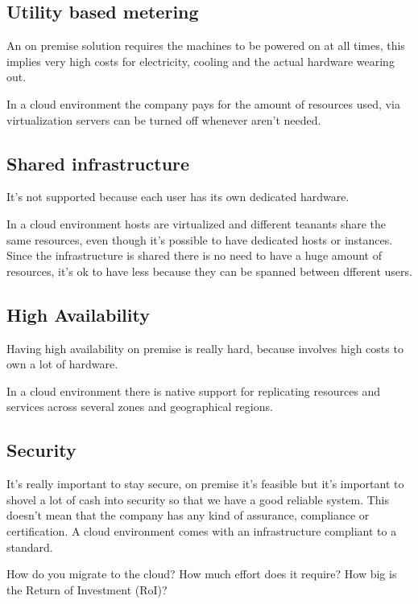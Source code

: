 \subsection{Utility based metering}
An on premise solution requires the machines to be powered on at all times, this implies very high costs for electricity, cooling and the actual hardware wearing out.

In a cloud environment the company pays for the amount of resources used, via virtualization servers can be turned off whenever aren't needed.

\subsection{Shared infrastructure}
It's not supported because each user has its own dedicated hardware.

In a cloud environment hosts are virtualized and different teanants share the same resources, even though it's possible to have dedicated hosts or instances. Since the infrastructure is shared there is no need to have a huge amount of resources, it's ok to have less because they can be spanned between dfferent users.

\subsection{High Availability}
Having high availability on premise is really hard, because involves high costs to own a lot of hardware.

In a cloud environment there is native support for replicating resources and services across several zones and geographical regions.

\subsection{Security}
It's really important to stay secure, on premise it's feasible but it's important to shovel a lot of cash into security so that we have a good reliable system. This doesn't mean that the company has any kind of assurance, compliance or certification. A cloud environment comes with an infrastructure compliant to a standard.

How do you migrate to the cloud? How much effort does it require? How big is the Return of
Investment (RoI)?

